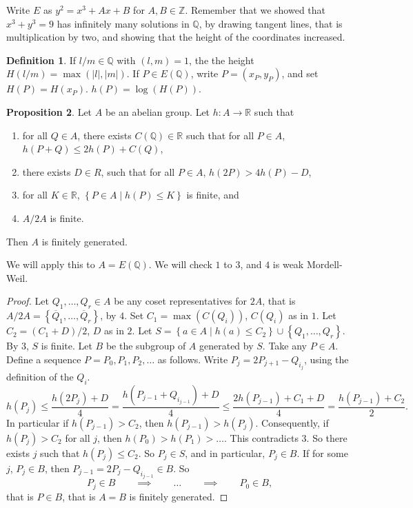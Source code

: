 \documentclass{article}
\newcommand{\Z}{\mathbb{Z}}
\newcommand{\Q}{\mathbb{Q}}
\newcommand{\R}{\mathbb{R}}
\newcommand{\rb}[1]{\left( #1 \right)}
\newcommand{\cb}[1]{\left\{ #1 \right\}}
\newcommand{\abs}[1]{\left\lvert #1 \right\rvert}
\theoremstyle{definition}\newtheorem{definition}{Definition}[section]
\theoremstyle{definition}\newtheorem{remark}[definition]{Remark}
\theoremstyle{definition}\newtheorem*{example}{Example}
\theoremstyle{definition}\newtheorem*{note}{Note}
\newtheorem{proposition}[definition]{Proposition}
\begin{document}

Write $ E $ as $ y^2 = x^3 + Ax + B $ for $ A, B \in \Z $. Remember that we showed that $ x^3 + y^3 = 9 $ has infinitely many solutions in $ \Q $, by drawing tangent lines, that is multiplication by two, and showing that the height of the coordinates increased.

\begin{definition}
If $ l / m \in \Q $ with $ \rb{l, m} = 1 $, the the height $ H\rb{l / m} = \max\rb{\abs{l}, \abs{m}} $. If $ P \in E\rb{\Q} $, write $ P = \rb{x_P, y_P} $, and set $ H\rb{P} = H\rb{x_P} $. $ h\rb{P} = \log\rb{H\rb{P}} $.
\end{definition}

\begin{proposition}
Let $ A $ be an abelian group. Let $ h : A \to \R $ such that
\begin{enumerate}
\item for all $ Q \in A $, there exists $ C\rb{\Q} \in \R $ such that for all $ P \in A $, $ h\rb{P + Q} \le 2h\rb{P} + C\rb{Q} $,
\item there exists $ D \in R $, such that for all $ P \in A $, $ h\rb{2P} > 4h\rb{P} - D $,
\item for all $ K \in \R $, $ \cb{P \in A \mid h\rb{P} \le K} $ is finite, and
\item $ A / 2A $ is finite.
\end{enumerate}
Then $ A $ is finitely generated.
\end{proposition}

We will apply this to $ A = E\rb{\Q} $. We will check $ 1 $ to $ 3 $, and $ 4 $ is weak Mordell-Weil.

\begin{proof}
Let $ Q_1, \dots, Q_r \in A $ be any coset representatives for $ 2A $, that is $ A / 2A = \cb{\overline{Q}_1, \dots, \overline{Q}_r} $, by $ 4 $. Set $ C_1 = \max\rb{C\rb{Q_i}} $, $ C\rb{Q_i} $ as in $ 1 $. Let $ C_2 = \rb{C_1 + D} / 2 $, $ D $ as in $ 2 $. Let $ S = \cb{a \in A \mid h\rb{a} \le C_2} \cup \cb{Q_1, \dots, Q_r} $. By $ 3 $, $ S $ is finite. Let $ B $ be the subgroup of $ A $ generated by $ S $. Take any $ P \in A $. Define a sequence $ P = P_0, P_1, P_2, \dots $ as follows. Write $ P_j = 2P_{j + 1} - Q_{i_j} $, using the definition of the $ Q_i $.
$$ h\rb{P_j} \le \dfrac{h\rb{2P_j} + D}{4} = \dfrac{h\rb{P_{j - 1} + Q_{i_{j - 1}}} + D}{4} \le \dfrac{2h\rb{P_{j - 1}} + C_1 + D}{4} = \dfrac{h\rb{P_{j - 1}} + C_2}{2}. $$
In particular if $ h\rb{P_{j - 1}} > C_2 $, then $ h\rb{P_{j - 1}} > h\rb{P_j} $. Consequently, if $ h\rb{P_j} > C_2 $ for all $ j $, then $ h\rb{P_0} > h\rb{P_1} > \dots $. This contradicts $ 3 $. So there exists $ j $ such that $ h\rb{P_j} \le C_2 $. So $ P_j \in S $, and in particular, $ P_j \in B $. If for some $ j $, $ P_j \in B $, then $ P_{j - 1} = 2P_j - Q_{i_{j - 1}} \in B $. So
$$ P_j \in B \qquad \implies \qquad \dots \qquad \implies \qquad P_0 \in B, $$
that is $ P \in B $, that is $ A = B $ is finitely generated.
\end{proof}
\end{document}
